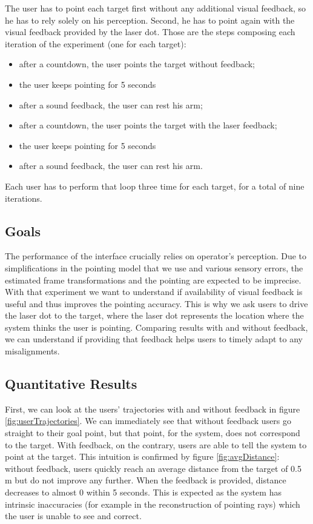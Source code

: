 The user has to point each target first without any additional visual feedback, so he has to rely solely on his perception. Second, he has to point again with the visual feedback provided by the laser dot. Those are the steps composing each iteration of the experiment (one for each target):
\begin{itemize}
    \item after a countdown, the user points the target without feedback;
    \item the user keeps pointing for 5 seconds
    \item after a sound feedback, the user can rest his arm;
    \item after a countdown, the user points the target with the laser feedback;
    \item the user keeps pointing for 5 seconds
    \item after a sound feedback, the user can rest his arm.
\end{itemize}
Each user has to perform that loop three time for each target, for a total of nine iterations.
\subsection{Goals}
The performance of the interface crucially relies on operator’s perception. Due to simplifications in the pointing model that we use and various sensory errors, the estimated frame transformations and the pointing are expected to be imprecise.\\
With that experiment we want to understand if availability of visual feedback is useful and thus improves the pointing accuracy. This is why we ask users to drive the laser dot to the target, where the laser dot represents the location where the system thinks the user is pointing. Comparing results with and without feedback, we can understand if providing that feedback helps users to timely adapt to any misalignments.

\subsection{Quantitative Results}
First, we can look at the users' trajectories with and without feedback in figure \ref{fig:userTrajectories}. We can immediately see that without feedback users go straight to their goal point, but that point, for the system, does not correspond to the target. With feedback, on the contrary, users are able to tell the system to point at the target. This intuition is confirmed by figure \ref{fig:avgDistance}: without feedback, users quickly reach an average distance from the target of 0.5 m but do not improve any further. When the feedback is provided, distance decreases to almost 0 within 5 seconds. This is expected as the system has intrinsic inaccuracies (for example in the reconstruction of pointing rays) which the user is unable to see and correct. 

